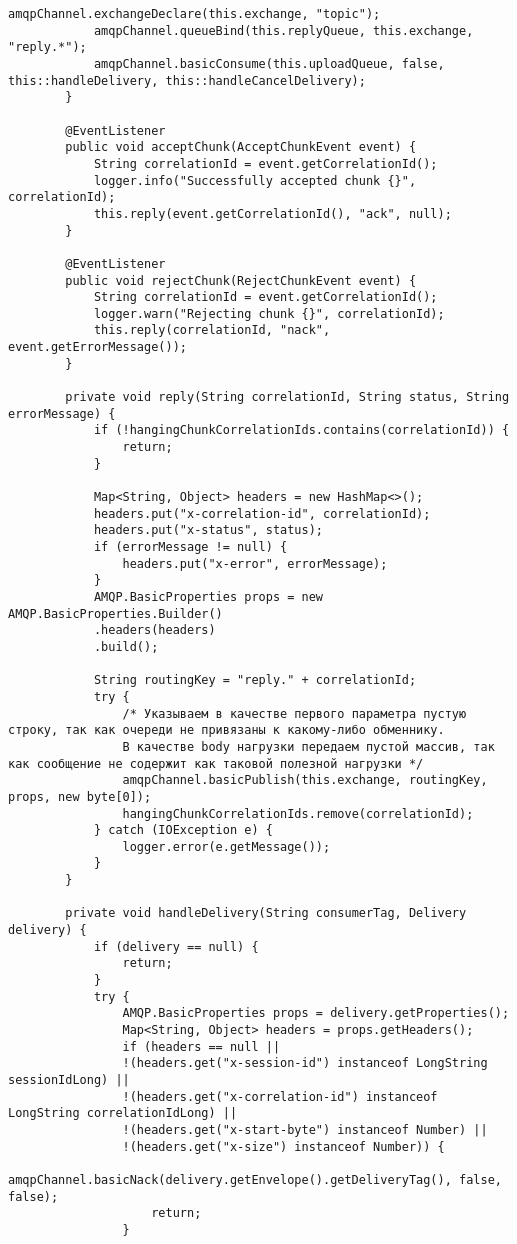 \begin{lstlisting}[caption={ChunkConsumerService.java}]
			amqpChannel.exchangeDeclare(this.exchange, "topic");
			amqpChannel.queueBind(this.replyQueue, this.exchange, "reply.*");
			amqpChannel.basicConsume(this.uploadQueue, false, this::handleDelivery, this::handleCancelDelivery);
		}
		
		@EventListener
		public void acceptChunk(AcceptChunkEvent event) {
			String correlationId = event.getCorrelationId();
			logger.info("Successfully accepted chunk {}", correlationId);
			this.reply(event.getCorrelationId(), "ack", null);
		}
		
		@EventListener
		public void rejectChunk(RejectChunkEvent event) {
			String correlationId = event.getCorrelationId();
			logger.warn("Rejecting chunk {}", correlationId);
			this.reply(correlationId, "nack", event.getErrorMessage());
		}
		
		private void reply(String correlationId, String status, String errorMessage) {
			if (!hangingChunkCorrelationIds.contains(correlationId)) {
				return;
			}
			
			Map<String, Object> headers = new HashMap<>();
			headers.put("x-correlation-id", correlationId);
			headers.put("x-status", status);
			if (errorMessage != null) {
				headers.put("x-error", errorMessage);
			}
			AMQP.BasicProperties props = new AMQP.BasicProperties.Builder()
			.headers(headers)
			.build();
			
			String routingKey = "reply." + correlationId;
			try {
				/* Указываем в качестве первого параметра пустую строку, так как очереди не привязаны к какому-либо обменнику.
				В качестве body нагрузки передаем пустой массив, так как сообщение не содержит как таковой полезной нагрузки */
				amqpChannel.basicPublish(this.exchange, routingKey, props, new byte[0]);
				hangingChunkCorrelationIds.remove(correlationId);
			} catch (IOException e) {
				logger.error(e.getMessage());
			}
		}
		
		private void handleDelivery(String consumerTag, Delivery delivery) {
			if (delivery == null) {
				return;
			}
			try {
				AMQP.BasicProperties props = delivery.getProperties();
				Map<String, Object> headers = props.getHeaders();
				if (headers == null ||
				!(headers.get("x-session-id") instanceof LongString sessionIdLong) ||
				!(headers.get("x-correlation-id") instanceof LongString correlationIdLong) ||
				!(headers.get("x-start-byte") instanceof Number) ||
				!(headers.get("x-size") instanceof Number)) {
					amqpChannel.basicNack(delivery.getEnvelope().getDeliveryTag(), false, false);
					return;
				}
				

\end{lstlisting}
